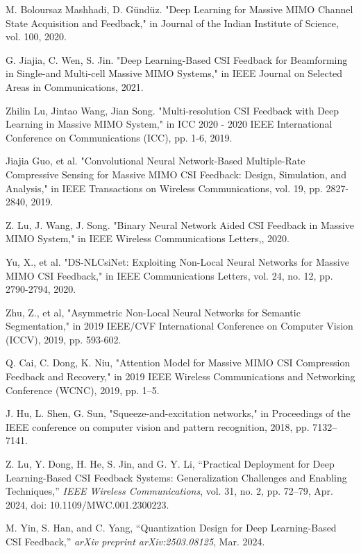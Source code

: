 \documentclass[lettersize,journal]{IEEEtran}
\begin{document}
\begin{thebibliography}{00}
	M. Boloursaz Mashhadi, D. Gündüz. "Deep Learning for Massive MIMO Channel State Acquisition and Feedback," in Journal of the Indian Institute of Science, vol. 100, 2020.
	
	G. Jiajia, C. Wen, S. Jin. "Deep Learning-Based CSI Feedback for Beamforming in Single-and Multi-cell Massive MIMO Systems," in IEEE Journal on Selected Areas in Communications, 2021.
	
	Zhilin Lu, Jintao Wang, Jian Song. "Multi-resolution CSI Feedback with Deep Learning in Massive MIMO System," in ICC 2020 - 2020 IEEE International Conference on Communications (ICC), pp. 1-6, 2019.
	
	Jiajia Guo, et al. "Convolutional Neural Network-Based Multiple-Rate Compressive Sensing for Massive MIMO CSI Feedback: Design, Simulation, and Analysis," in IEEE Transactions on Wireless Communications, vol. 19, pp. 2827-2840, 2019.
	
	Z. Lu, J. Wang, J. Song. "Binary Neural Network Aided CSI Feedback in Massive MIMO System," in IEEE Wireless Communications Letters,, 2020.
	
	Yu, X., et al. "DS-NLCsiNet: Exploiting Non-Local Neural Networks for Massive MIMO CSI Feedback," in IEEE Communications Letters, vol. 24, no. 12, pp. 2790-2794, 2020.
	
	Zhu, Z., et al, "Asymmetric Non-Local Neural Networks for Semantic Segmentation," in 2019 IEEE/CVF International Conference on Computer Vision (ICCV), 2019, pp. 593-602.
	
	Q. Cai, C. Dong, K. Niu, "Attention Model for Massive MIMO CSI Compression Feedback and Recovery," in 2019 IEEE Wireless Communications and Networking Conference (WCNC), 2019, pp. 1–5.
	
	J. Hu, L. Shen, G. Sun, "Squeeze-and-excitation networks," in Proceedings of the IEEE conference on computer vision and pattern recognition, 2018, pp. 7132–7141.
	
    Z. Lu, Y. Dong, H. He, S. Jin, and G. Y. Li, 
    ``Practical Deployment for Deep Learning-Based CSI Feedback Systems: Generalization Challenges and Enabling Techniques,''
    \emph{IEEE Wireless Communications}, 
    vol. 31, no. 2, pp. 72--79, 
    Apr. 2024, 
    doi: 10.1109/MWC.001.2300223.

    M. Yin, S. Han, and C. Yang,
    ``Quantization Design for Deep Learning-Based CSI Feedback,''
    \emph{arXiv preprint arXiv:2503.08125},
    Mar. 2024.
	

\end{thebibliography}
\end{document}
